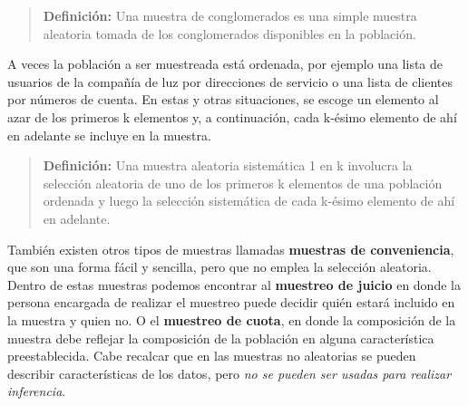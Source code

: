 \documentclass[]{article}
\begin{document}
\begin{quote}
	\textbf{Definición:} Una muestra de conglomerados es una simple muestra aleatoria tomada de los conglomerados disponibles en la población.
\end{quote}
A veces la población a ser muestreada está ordenada, por ejemplo una lista de usuarios de la compañía de luz por direcciones de servicio o una lista de clientes por números de cuenta. En estas y otras situaciones, se escoge un elemento al azar de los primeros k elementos y, a continuación, cada k-ésimo elemento de ahí en adelante se incluye en la muestra.
\begin{quote}
	\textbf{Definición:} Una muestra aleatoria sistemática 1 en k involucra la selección aleatoria de uno de los primeros k elementos de una población ordenada y luego la selección sistemática de cada k-ésimo elemento de ahí en adelante.
\end{quote}
También existen otros tipos de muestras llamadas \textbf{muestras de conveniencia}, que son una forma fácil y sencilla, pero que no emplea la selección aleatoria. Dentro de estas muestras podemos encontrar al \textbf{muestreo de juicio} en donde la persona encargada de realizar el muestreo puede decidir quién estará incluido en la muestra y quien no. O el \textbf{muestreo de cuota}, en donde la composición de la muestra debe reflejar la composición de la población en alguna característica preestablecida. Cabe recalcar que en las muestras no aleatorias se pueden describir características de los datos, pero \textit{no se pueden ser usadas para realizar inferencia}.
\end{document}
